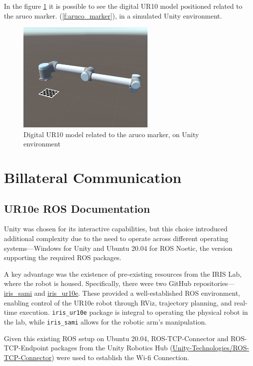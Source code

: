 In the figure \ref{f:ur10_marker_unity} it is possible to see the digital UR10 model positioned related to the aruco marker. 
    (\ref{f:aruco_marker}), in a simulated Unity environment.
    \begin{figure}[h]
    \centering
    \includegraphics[width=0.6\textwidth]{figs/robot_marker_unity.jpg}
    \caption{Digital UR10 model related to the aruco marker, on Unity environment}
    \label{f:ur10_marker_unity}
    \end{figure}

\section{Billateral Communication}

\subsection{UR10e ROS Documentation}
Unity was chosen for its interactive capabilities, but this choice introduced additional complexity due to the need to operate across different operating systems—Windows for Unity and Ubuntu 20.04 for ROS Noetic, the version supporting the required ROS packages.

A key advantage was the existence of pre-existing resources from the IRIS Lab, where the robot is housed. Specifically, there were two GitHub repositories—\href{https://github.com/iris-ua/iris_sami}{iris\_sami} and \href{https://github.com/iris-ua/iris_ur10e}{iris\_ur10e}. These provided a well-established ROS environment, enabling control of the UR10e robot through RViz, trajectory planning, and real-time execution. \texttt{iris\_ur10e} package is integral to operating the physical robot in the lab, while \texttt{iris\_sami} allows for the robotic arm's manipulation.

Given this existing ROS setup on Ubuntu 20.04, ROS-TCP-Connector and ROS-TCP-Endpoint packages from the Unity Robotics Hub (\href{https://github.com/Unity-Technologies/ROS-TCP-Connector}{Unity-Technologies/ROS-TCP-Connector}) were used to establish the Wi-fi Connection. 

